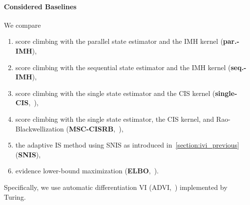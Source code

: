 \paragraph{Considered Baselines}
We compare 
\vspace{-0.1in}
\begin{enumerate}[noitemsep]
  \item[\ding{182}] score climbing with the parallel state estimator and the IMH kernel (\textbf{par.-IMH}), 
  \item[\ding{183}] score climbing with the sequential state estimator and the IMH kernel (\textbf{seq.-IMH}), 
  \item[\ding{184}] score climbing with the single state estimator and the CIS kernel (\textbf{single-CIS},~\citealt{NEURIPS2020_b2070693}), 
  \item[\ding{185}] score climbing with the single state estimator, the CIS kernel, and Rao-Blackwellization (\textbf{MSC-CISRB},~\citealt{NEURIPS2020_b2070693}),
  \item[\ding{186}] the adaptive IS method using SNIS as introduced in~\cref{section:ivi_previous} (\textbf{SNIS}),
  \item[\ding{187}] evidence lower-bound maximization (\textbf{ELBO},~\citealt{pmlr-v33-ranganath14}).
\end{enumerate}
Specifically, we use automatic differentiation VI (ADVI,~\citealt{JMLR:v18:16-107}) implemented by Turing.

